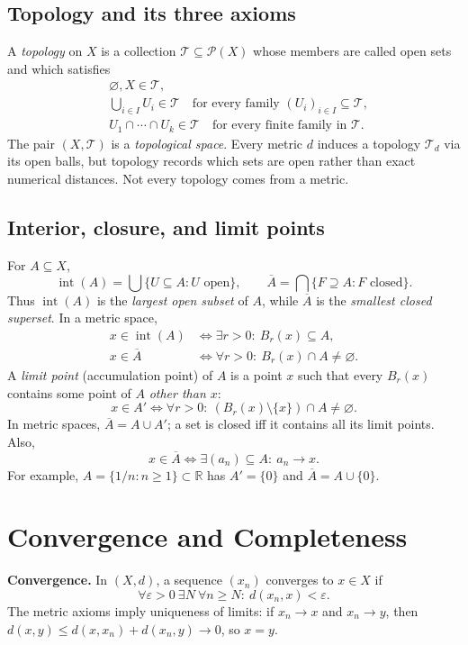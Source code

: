 \documentclass[10pt,a4paper]{article}
\newcommand{\R}{\mathbb R}
\newcommand{\eps}{\varepsilon}
\newcommand{\cl}[1]{\overline{#1}}
\begin{document}
\subsection{Topology and its three axioms}
A \emph{topology} on $X$ is a collection $\mathcal T\subseteq\mathcal P(X)$ whose members are called open sets and which satisfies
\[
\boxed{\begin{aligned}
&\varnothing,X\in\mathcal T,\\
&\bigcup_{i\in I}U_i\in\mathcal T\quad\text{for every family }(U_i)_{i\in I}\subseteq\mathcal T,\\
&U_1\cap\cdots\cap U_k\in\mathcal T\quad\text{for every finite family in }\mathcal T.
\end{aligned}}
\]
The pair $(X,\mathcal T)$ is a \emph{topological space}. Every metric $d$ induces a topology $\mathcal T_d$ via its open balls, but topology records which sets are open rather than exact numerical distances. Not every topology comes from a metric.

\subsection{Interior, closure, and limit points}
For $A\subseteq X$,
\[
\operatorname{int}(A)=\bigcup\{U\subseteq A:U\text{ open}\},\qquad
\cl A=\bigcap\{F\supseteq A:F\text{ closed}\}.
\]
Thus $\operatorname{int}(A)$ is the \emph{largest open subset} of $A$, while $\cl A$ is the \emph{smallest closed superset}. In a metric space,
\[
\boxed{\begin{aligned}
x\in\operatorname{int}(A)&\iff \exists r>0:\ B_r(x)\subseteq A,\\
x\in\cl A&\iff \forall r>0:\ B_r(x)\cap A\ne\varnothing.
\end{aligned}}
\]
A \emph{limit point} (accumulation point) of $A$ is a point $x$ such that every $B_r(x)$ contains some point of $A$ \emph{other than $x$}:
\[
x\in A'\iff \forall r>0:\ (B_r(x)\setminus\{x\})\cap A\ne\varnothing.
\]
In metric spaces, $\cl A=A\cup A'$; a set is closed iff it contains all its limit points. Also,
\[
x\in\cl A\iff\exists (a_n)\subseteq A:\ a_n\to x.
\]
For example, $A=\{1/n:n\ge1\}\subset\R$ has $A'=\{0\}$ and $\cl A=A\cup\{0\}$.

\section{Convergence and Completeness}
\textbf{Convergence.} In $(X,d)$, a sequence $(x_n)$ converges to $x\in X$ if
\[
\boxed{\forall\eps>0\ \exists N\ \forall n\ge N:\ d(x_n,x)<\eps.}
\]
The metric axioms imply uniqueness of limits: if $x_n\to x$ and $x_n\to y$, then $d(x,y)\le d(x,x_n)+d(x_n,y)\to0$, so $x=y$.
\end{document}

